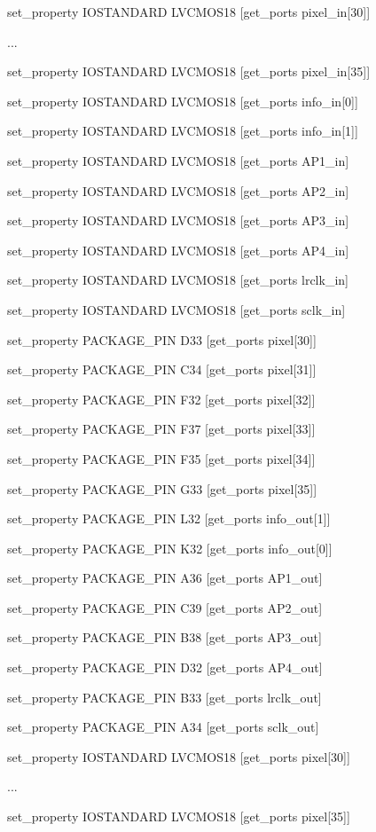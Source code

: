 set\_property IOSTANDARD LVCMOS18 [get\_ports {pixel\_in[30]}]

...

set\_property IOSTANDARD LVCMOS18 [get\_ports {pixel\_in[35]}]

set\_property IOSTANDARD LVCMOS18 [get\_ports {info\_in[0]}]

set\_property IOSTANDARD LVCMOS18 [get\_ports {info\_in[1]}]

set\_property IOSTANDARD LVCMOS18 [get\_ports AP1\_in]

set\_property IOSTANDARD LVCMOS18 [get\_ports AP2\_in]

set\_property IOSTANDARD LVCMOS18 [get\_ports AP3\_in]

set\_property IOSTANDARD LVCMOS18 [get\_ports AP4\_in]

set\_property IOSTANDARD LVCMOS18 [get\_ports lrclk\_in]

set\_property IOSTANDARD LVCMOS18 [get\_ports sclk\_in]


set\_property PACKAGE\_PIN D33 [get\_ports {pixel[30]}]

set\_property PACKAGE\_PIN C34 [get\_ports {pixel[31]}]

set\_property PACKAGE\_PIN F32 [get\_ports {pixel[32]}]

set\_property PACKAGE\_PIN F37 [get\_ports {pixel[33]}]

set\_property PACKAGE\_PIN F35 [get\_ports {pixel[34]}]

set\_property PACKAGE\_PIN G33 [get\_ports {pixel[35]}]

set\_property PACKAGE\_PIN L32 [get\_ports {info\_out[1]}] %

set\_property PACKAGE\_PIN K32 [get\_ports {info\_out[0]}] %

set\_property PACKAGE\_PIN A36 [get\_ports AP1\_out] %

set\_property PACKAGE\_PIN C39 [get\_ports AP2\_out] %

set\_property PACKAGE\_PIN B38 [get\_ports AP3\_out] %

set\_property PACKAGE\_PIN D32 [get\_ports AP4\_out] %

set\_property PACKAGE\_PIN B33 [get\_ports lrclk\_out] %

set\_property PACKAGE\_PIN A34 [get\_ports sclk\_out] %

set\_property IOSTANDARD LVCMOS18 [get\_ports {pixel[30]}]

...

set\_property IOSTANDARD LVCMOS18 [get\_ports {pixel[35]}]

